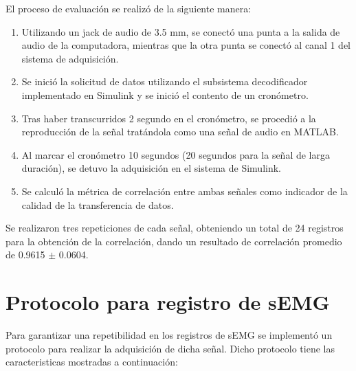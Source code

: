El proceso de evaluación se realizó de la siguiente manera:
\begin{enumerate}
	\item Utilizando un jack de audio de 3.5 mm, se conectó una punta a la salida de audio de la computadora, mientras que la otra punta se conectó al canal 1 del sistema de adquisición.
	\item Se inició la solicitud de datos utilizando el subsistema decodificador implementado en Simulink y se inició el contento de un cronómetro.
	\item Tras haber transcurridos 2 segundo en el cronómetro, se procedió a la reproducción de la señal tratándola como una señal de audio en MATLAB.
	\item Al marcar el cronómetro 10 segundos (20 segundos para la señal de larga duración), se detuvo la adquisición en el sistema de Simulink.
	\item Se calculó la métrica de correlación entre ambas señales como indicador de la calidad de la transferencia de datos.
\end{enumerate}

Se realizaron tres repeticiones de cada señal, obteniendo un total de 24 registros para la obtención de la correlación, dando un resultado de correlación promedio de 0.9615 $\pm$ 0.0604.

\section{Protocolo para registro de sEMG}
Para garantizar una repetibilidad en los registros de sEMG se implementó un protocolo para realizar la adquisición de dicha señal. Dicho protocolo tiene las caracteristicas mostradas a continuación:

